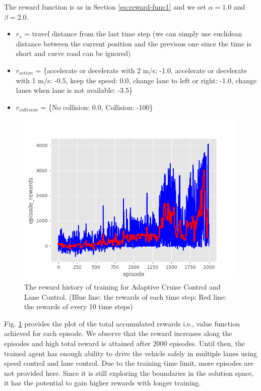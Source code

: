 The reward function is as in Section \ref{eq:reward-func1} and we set $\alpha = 1.0$ and $\beta = 2.0$. 

\begin{itemize}
 \item $r_s$ = travel distance from the last time step (we can simply use euclidean distance between the current position and the previous one since the time is short and curve road can be ignored)
 \item $r_{action}$ = \{accelerate or decelerate with 2 m/s: -1.0, accelerate or decelerate with 1 m/s: -0.5, keep the speed: 0.0, change lane to left or right: -1.0, change lanes when lane is not available: -3.5\}
 \item $r_{collision}$ = \{No collision: 0.0, Collision: -100\}
\end{itemize}

\begin{figure}[h]
\centering
\includegraphics[width=1.0\textwidth]{figs/ch5/auto-reward}
\caption{The reward history of training for Adaptive Cruise Control and Lane Control. (Blue line: the rewards of each time step; Red line: the rewards of every 10 time steps)}
\label{fig:auto}
\end{figure}

Fig. \ref{fig:auto} provides the plot of the total accumulated rewards i.e., value function achieved for each episode. We observe that the reward increases along the episodes and high total reward is attained after 2000 episodes. Until then, the trained agent has enough ability to drive the vehicle safely in multiple lanes using speed control and lane control. Due to the training time limit, more episodes are not provided here. Since it is still exploring the boundaries in the solution space, it has the potential to gain higher rewards with longer training.


